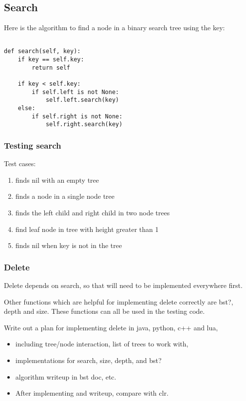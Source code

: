 \documentclass{article}
\begin{document}
\subsection{Search}

Here is the algorithm to find a node in a binary search tree using the key:

\begin{lstlisting}[frame=single]

def search(self, key):
    if key == self.key:
        return self

    if key < self.key:
        if self.left is not None:
            self.left.search(key)
    else:
        if self.right is not None:
            self.right.search(key)
\end{lstlisting}

\subsubsection{Testing search}

Test cases:
\begin{enumerate}
\item finds nil with an empty tree
\item finds a node in a single node tree
\item finds the left child and right child in two node trees
\item find leaf node in tree with height greater than 1
\item finds nil when key is not in the tree
\end{enumerate}

\subsubsection{Delete}

Delete depends on search, so that will need to be implemented everywhere first.

Other functions which are helpful for implementing delete correctly
are bst?, depth and size. These functions can all be used in the testing
code.

Write out a plan for implementing delete in java, python, c++ and lua,

\begin{itemize}
  \item including tree/node interaction, list of trees to work with,
  \item implementations for search, size, depth, and bst?
  \item algorithm writeup in bst doc, etc.
  \item After implementing and writeup, compare with clr.
\end{itemize}
\end{document}

